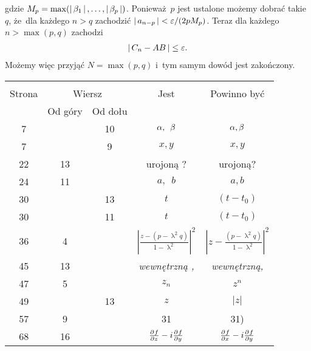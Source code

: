 \documentclass[a4paper,11pt]{article}
\begin{document}
gdzie $M_{ p } = \max( \left| \,  \beta_{ 1 }  \, \right|, \ldots, \left| \,  \beta_{ p }  \, \right| )$.
Ponieważ~$p$ jest ustalone możemy dobrać takie $q$, że~dla każdego
$n > q$ zachodzić $\left| \,  a_{ n - p }  \, \right| < \varepsilon / ( 2 p M_{ p } )$.
Teraz dla każdego $n > \max( p, q )$ zachodzi
\begin{equation}
  \label{eq:14}
  \begin{split}
    \left| \,  C_{ n } - AB  \, \right| \leq \varepsilon.
  \end{split}
\end{equation}
Możemy więc przyjąć $N = \max( p, q )$ i~tym samym dowód jest
zakończony.


\begin{center}
  \begin{tabular}{|c|c|c|c|c|}
    \hline
    & \multicolumn{2}{c|}{} & & \\
    Strona & \multicolumn{2}{c|}{Wiersz} & Jest
                              & Powinno być \\ \cline{2-3}
    & Od góry & Od dołu & & \\
    \hline
    7   & & 10 & $\alpha,\:\; \beta$ & $\alpha, \beta$ \\
    7   & &  9 & $x,\! y$ & $x, y$ \\
    22  & 13 & & urojoną ? & urojoną? \\
    24  & 11 & & $a, \:\; b$ & $a, b$ \\
    30  & & 13 & $t$ & $( t - t_{ 0 } )$ \\
    30  & & 11 & $t$ & $( t - t_{ 0 } )$ \\
    36  &  4 & & $\left| \frac{ z - ( p - \uplambda^{ 2 } q) }{ 1
                 - \uplambda^{ 2 } } \right|^{ 2 }$
           & $\left| z - \frac{ ( p - \uplambda^{ 2 } q) }{ 1
             - \uplambda^{ 2 } } \right|^{ 2 }$ \\
    45  & 13 & & \emph{wewnętrzną ,} & \emph{wewnętrzną,} \\
    47  &  5 & & $z_{ n }$ & $z^{ n }$ \\
    49  & & 13 & $z$ & $| z |$ \\
    57  &  9 & & 31 & 31) \\
    68  & 16 & & $\frac{ \partial^{  } {  f  } }{ \partial {  z  }^{  } } - i \frac{ \partial^{  } {  f  } }{ \partial {  y  }^{  } }$
           & $\frac{ \partial^{  } {  f  } }{ \partial {  x  }^{  } } - i \frac{ \partial^{  } {  f  } }{ \partial {  y  }^{  } }$ \\
    \hline
  \end{tabular}
\end{center}
\end{document}
